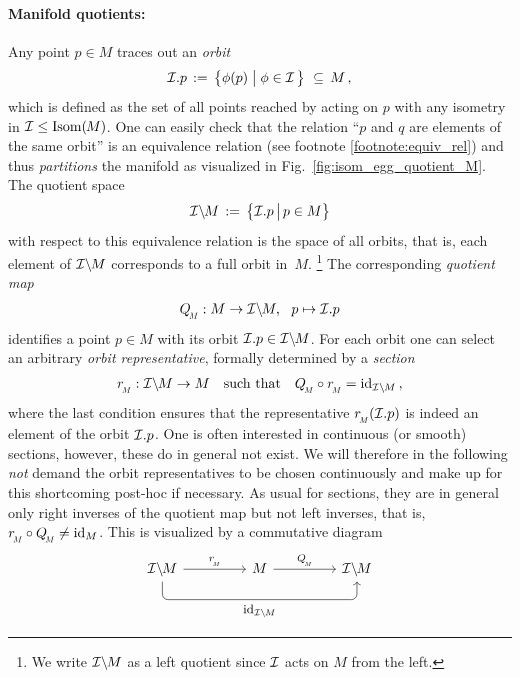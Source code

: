\paragraph{Manifold quotients:} 

Any point $p\in M$ traces out an \emph{orbit}
\begin{align}\label{eq:orbit_Ip}
    \I.p \,:=\, \big\{ \phi(p) \;\big|\; \phi \in\I \,\big\}\ \subseteq\, M \,,
\end{align}
which is defined as the set of all points reached by acting on $p$ with any isometry in $\mathcal{I} \leq \operatorname{Isom}(\mkern-1.5mu M \mkern-.5mu)$.
One can easily check that the relation ``$p$ and $q$ are elements of the same orbit'' is an equivalence relation (see footnote \ref{footnote:equiv_rel}) and thus \emph{partitions} the manifold as visualized in Fig.~\ref{fig:isom_egg_quotient_M}.
The quotient space
\begin{align}\label{eq:quotientspace_IM}
    \mathcal{I}\backslash\mkern-1.5mu M \, :=\, \big\{ \mathcal{I}.p \,\big|\, p\in M \big\}
\end{align}
with respect to this equivalence relation is the space of all orbits, that is, each element of $\mathcal{I}\backslash\mkern-1.5mu M$ corresponds to a full orbit in~$M$.%
\footnote{%
    We write $\mathcal{I}\backslash\mkern-1.5mu M$ as a left quotient since $\mathcal{I}$ acts on $M$ from the left.
}
The corresponding \emph{quotient map}
\begin{align}\label{eq:quotientmap_QM}
    \QM: M\to\IM,\ \ p\mapsto \I.p
\end{align}
identifies a point $p \in M$ with its orbit $\mathcal{I}.p \in \mathcal{I}\backslash\mkern-1.5mu M$.
For each orbit one can select an arbitrary \emph{orbit representative}, formally determined by a \emph{section}
\begin{align}\label{eq:section_rM}
    \rM: \IM\to M \quad \textup{such that}\quad \QM\circ\rM = \id_{\IM} \,,
\end{align}
where the last condition ensures that the representative $\rM(\I.p)$ is indeed an element of the orbit $\mathcal{I}.p$.
One is often interested in continuous (or smooth) sections, however, these do in general not exist.
We will therefore in the following \emph{not} demand the orbit representatives to be chosen continuously and make up for this shortcoming post-hoc if necessary.
As usual for sections, they are in general only right inverses of the quotient map but not left inverses, that is, $\rM\circ\QM \neq \id_M$.
This is visualized by a commutative diagram
\begin{equation}
\begin{tikzcd}[row sep=3em, column sep=4.5em]
      \IM
            \arrow[r, "\rM"]
            \arrow[rr, rounded corners, to path={ 
                  -- ([yshift=-3.ex]\tikztostart.south) 
                  --node[below, pos=.5]{\small$\id_{\IM}$} ([yshift=-3.ex]\tikztotarget.south) 
                  -- (\tikztotarget.south)
                  }]
    & M
            \arrow[r, "\QM"]
    & \IM
\end{tikzcd}
\end{equation}
